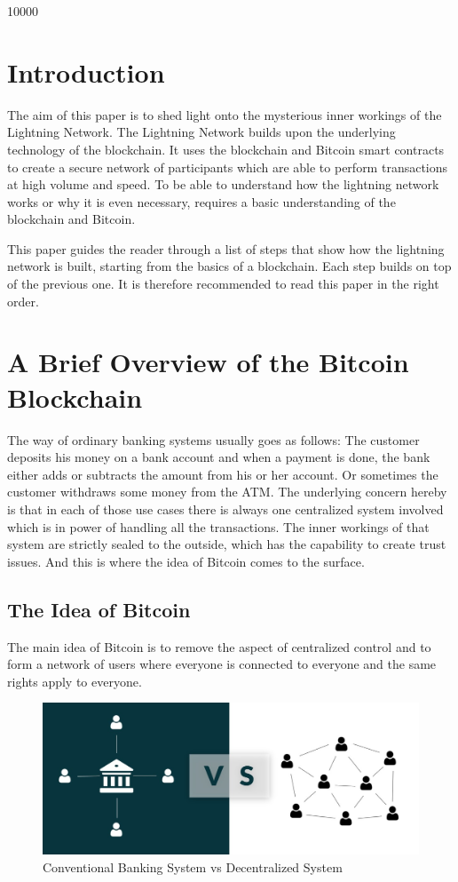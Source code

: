 \documentclass[a4paper, 12pt]{report}
\begin{document}
 10000
\raggedbottom

\chapter{Introduction}
\par The aim of this paper is to shed light onto the mysterious inner workings of the Lightning Network. The Lightning Network builds upon the underlying technology of the blockchain. It uses the blockchain and Bitcoin smart contracts to create a secure network of participants which are able to perform transactions at high volume and speed. To be able to understand how the lightning network works or why it is even necessary, requires a basic understanding of the blockchain and Bitcoin.
\par This paper guides the reader through a list of steps that show how the lightning network is built, starting from the basics of a blockchain. Each step builds on top of the previous one. It is therefore recommended to read this paper in the right order.

\chapter{A Brief Overview of the Bitcoin Blockchain}
\par The way of ordinary banking systems usually goes as follows: The customer deposits his money on a bank account and when a payment is done, the bank either adds or subtracts the amount from his or her account. Or sometimes the customer withdraws some money from the ATM. The underlying concern hereby is that in each of those use cases there is always one centralized system involved which is in power of handling all the transactions. The inner workings of that system are strictly sealed to the outside, which has the capability to create trust issues. And this is where the idea of Bitcoin comes to the surface.

\section{The Idea of Bitcoin}
\par The main idea of Bitcoin is to remove the aspect of centralized control and to form a network of users where everyone is connected to everyone and the same rights apply to everyone.  

\begin{figure}[h]
	\includegraphics[width=\textwidth]{01_Decentralized}
	\caption{Conventional Banking System vs Decentralized System}
	\label{fig:01_Decentralized}
\end{figure}
\end{document}
